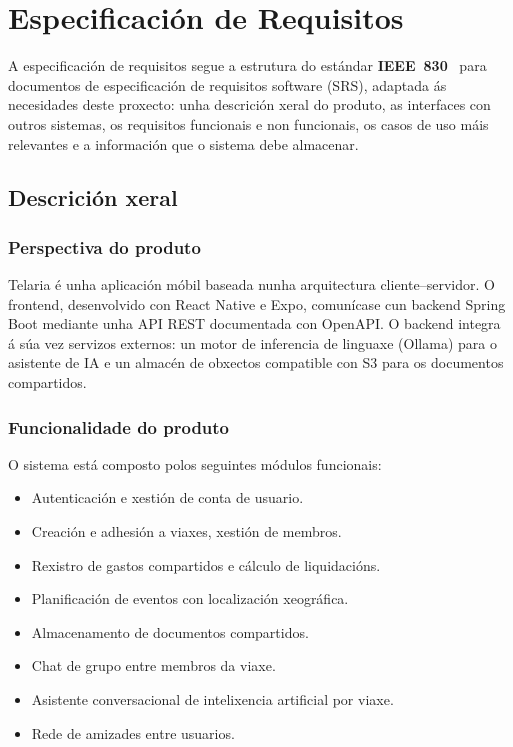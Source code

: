 \chapter{Especificación de Requisitos}

A especificación de requisitos segue a estrutura do estándar \textbf{IEEE~830}~\cite{ieee830} para
documentos de especificación de requisitos software (SRS), adaptada ás necesidades
deste proxecto: unha descrición xeral do produto, as interfaces con outros sistemas, os
requisitos funcionais e non funcionais, os casos de uso máis relevantes e a información
que o sistema debe almacenar.

\section{Descrición xeral}

\subsection{Perspectiva do produto}

Telaria é unha aplicación móbil baseada nunha arquitectura cliente–servidor. O frontend,
desenvolvido con React Native e Expo, comunícase cun backend Spring Boot mediante unha
API REST documentada con OpenAPI. O backend integra á súa vez servizos externos: un
motor de inferencia de linguaxe (Ollama) para o asistente de IA e un almacén de obxectos
compatible con S3 para os documentos compartidos.

\subsection{Funcionalidade do produto}

O sistema está composto polos seguintes módulos funcionais:

\begin{itemize}
  \item Autenticación e xestión de conta de usuario.
  \item Creación e adhesión a viaxes, xestión de membros.
  \item Rexistro de gastos compartidos e cálculo de liquidacións.
  \item Planificación de eventos con localización xeográfica.
  \item Almacenamento de documentos compartidos.
  \item Chat de grupo entre membros da viaxe.
  \item Asistente conversacional de intelixencia artificial por viaxe.
  \item Rede de amizades entre usuarios.
\end{itemize}

